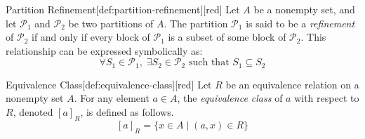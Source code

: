 \begin{define}{Partition Refinement}[def:partition-refinement][red]
  Let $A$ be a nonempty set, and let $\mathcal{P}_1$ and $\mathcal{P}_2$ be 
  two partitions of $A$. The partition $\mathcal{P}_1$ is said to be a 
  \emph{refinement} of $\mathcal{P}_2$ if and only if every block of 
  $\mathcal{P}_1$ is a subset of some block of $\mathcal{P}_2$. 
  This relationship can be expressed symbolically as:
  $$ \forall S_1 \in \mathcal{P}_1, \; \exists S_2 \in \mathcal{P}_2 \text{ such that } S_1 \subseteq S_2 $$
\end{define}

\begin{define}{Equivalence Class}[def:equivalence-class][red]
  Let $R$ be an equivalence relation on a nonempty set $A$. For any element $a \in A$, 
  the \emph{equivalence class} of $a$ with respect to $R$, denoted $[a]_R$, is 
  defined as follows.
  $$ [a]_R = \{x \in A \mid (a,x) \in R \} $$
\end{define}








\newpage

